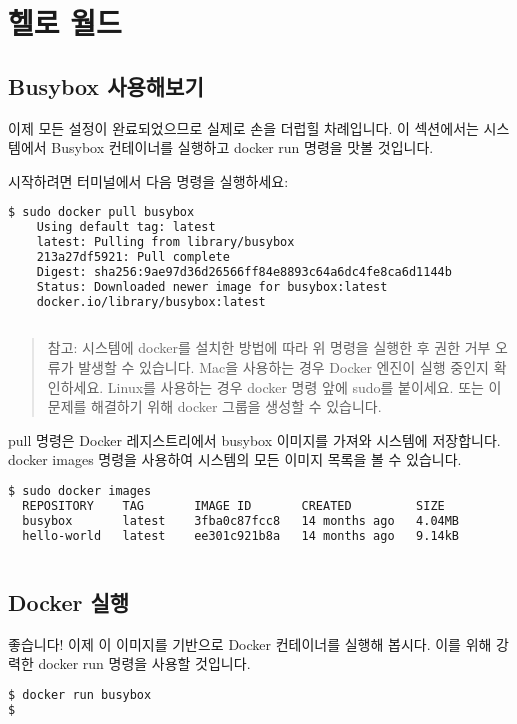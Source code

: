 \chapter{헬로 월드}
\section{Busybox 사용해보기}
이제 모든 설정이 완료되었으므로 실제로 손을 더럽힐 차례입니다. 이 섹션에서는 시스템에서 Busybox 컨테이너를 실행하고 docker run 명령을 맛볼 것입니다.

시작하려면 터미널에서 다음 명령을 실행하세요:
\begin{lstlisting}[language=bash]
$ sudo docker pull busybox
    Using default tag: latest
    latest: Pulling from library/busybox
    213a27df5921: Pull complete 
    Digest: sha256:9ae97d36d26566ff84e8893c64a6dc4fe8ca6d1144b
    Status: Downloaded newer image for busybox:latest
    docker.io/library/busybox:latest
    
\end{lstlisting}

\begin{quote}
참고: 시스템에 docker를 설치한 방법에 따라 위 명령을 실행한 후 권한 거부 오류가 발생할 수 있습니다. Mac을 사용하는 경우 Docker 엔진이 실행 중인지 확인하세요. Linux를 사용하는 경우 docker 명령 앞에 sudo를 붙이세요. 또는 이 문제를 해결하기 위해 docker 그룹을 생성할 수 있습니다.
\end{quote}

pull 명령은 Docker 레지스트리에서 busybox 이미지를 가져와 시스템에 저장합니다. docker images 명령을 사용하여 시스템의 모든 이미지 목록을 볼 수 있습니다.
\begin{lstlisting}[language=bash]
$ sudo docker images
  REPOSITORY    TAG       IMAGE ID       CREATED         SIZE
  busybox       latest    3fba0c87fcc8   14 months ago   4.04MB
  hello-world   latest    ee301c921b8a   14 months ago   9.14kB
    
\end{lstlisting}

\section{Docker 실행}
좋습니다! 이제 이 이미지를 기반으로 Docker 컨테이너를 실행해 봅시다. 이를 위해 강력한 docker run 명령을 사용할 것입니다.
\begin{lstlisting}[language=bash]
$ docker run busybox
$
\end{lstlisting}

